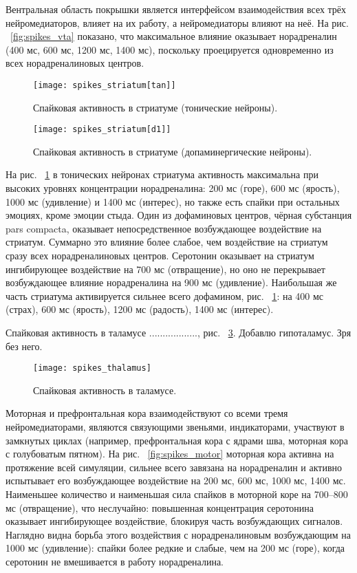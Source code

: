 Вентральная область покрышки является интерфейсом взаимодействия всех трёх нейромедиаторов, влияет на их работу, а нейромедиаторы влияют на неё. На рис. ~\ref{fig:spikes_vta} показано, что максимальное влияние оказывает норадреналин (400 мс, 600 мс, 1200 мс, 1400 мс), поскольку проецируется одновременно из всех норадреналиновых центров.

\begin{figure}
	\centering
	\texttt{[image: spikes\_striatum[tan]]}
	\caption{Спайковая активность в стриатуме (тонические нейроны).}
	\label{fig:spikes_striatum}
\end{figure}

\begin{figure}
	\centering
	\texttt{[image: spikes\_striatum[d1]]}
	\caption{Спайковая активность в стриатуме (допаминергические нейроны).}
	\label{fig:spikes_striatumх[d1]}
\end{figure}


На рис. ~\ref{fig:spikes_striatum} в тонических нейронах стриатума активность максимальна при высоких уровнях концентрации норадреналина: 200 мс (горе), 600 мс (ярость), 1000 мс (удивление) и 1400 мс (интерес), но также есть спайки при остальных эмоциях, кроме эмоции стыда. Один из дофаминовых центров, чёрная субстанция pars compacta, оказывает непосредственное возбуждающее воздействие на стриатум. Суммарно это влияние более слабое, чем воздействие на стриатум сразу всех норадреналиновых центров. Серотонин оказывает на стриатум ингибирующее воздействие на 700 мс (отвращение), но оно не перекрывает возбуждающее влияние норадреналина на 900 мс (удивление). Наибольшая же часть стриатума активируется сильнее всего дофамином, рис. ~\ref{fig:spikes_striatum}: на 400 мс (страх), 600 мс (ярость), 1200 мс (радость), 1400 мс (интерес).


Спайковая активность в таламусе .................., рис. ~\ref{fig:spikes_thalamus}.
Добавлю гипоталамус. Зря без него.

\begin{figure}
	\centering
	\texttt{[image: spikes\_thalamus]}
	\caption{Спайковая активность в таламусе.}
	\label{fig:spikes_thalamus}
\end{figure}

Моторная и префронтальная кора взаимодействуют со всеми тремя нейромедиаторами, являются связующими звеньями, индикаторами, участвуют в замкнутых циклах (например, префронтальная кора с ядрами шва, моторная кора с голубоватым пятном). На рис. ~\ref{fig:spikes_motor} моторная кора активна на протяжение всей симуляции, сильнее всего завязана на норадреналин и активно испытывает его возбуждающее воздействие на 200 мс, 600 мс, 1000 мс, 1400 мс. Наименьшее количество и наименьшая сила спайков в моторной коре на 700--800 мс (отвращение), что неслучайно: повышенная концентрация серотонина оказывает ингибирующее воздействие, блокируя часть возбуждающих сигналов. Наглядно видна борьба этого воздействия с норадреналиновым возбуждающим на 1000 мс (удивление): спайки более редкие и слабые, чем на 200 мс (горе), когда серотонин не вмешивается в работу норадреналина.



